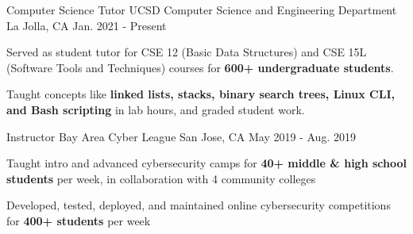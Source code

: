 

\begin{cventries}

  \cventry
    {Computer Science Tutor} %
    {UCSD Computer Science and Engineering Department} %
    {La Jolla, CA} %
    {Jan. 2021 - Present} %
    {
      \begin{cvitems} %
        \item {Served as student tutor for CSE 12 (Basic Data Structures) and CSE 15L (Software Tools and Techniques) courses for \textbf{600+ undergraduate students}.}
        \item {Taught concepts like \textbf{linked lists, stacks, binary search trees, Linux CLI, and Bash scripting} in lab hours, and graded student work.}
      \end{cvitems}
    }


  \cventry
    {Instructor} %
    {Bay Area Cyber League} %
    {San Jose, CA} %
    {May 2019 - Aug. 2019} %
    {
      \begin{cvitems} %
        \item {Taught intro and advanced cybersecurity camps for \textbf{40+ middle \& high school students} per week, in collaboration with 4 community colleges}
        \item {Developed, tested, deployed, and maintained online cybersecurity competitions for \textbf{400+ students} per week}
      \end{cvitems}
    }


\end{cventries}
